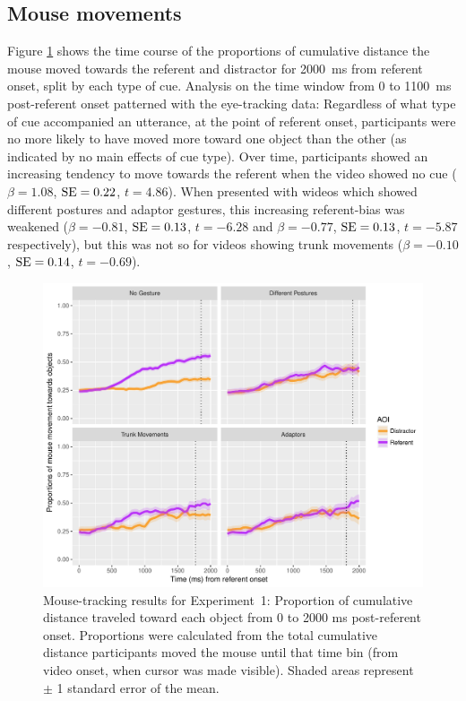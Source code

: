\documentclass[a4paper,man,natbib]{apa6}
\newcommand{\resultsLM}[3]{$\beta = #1$, $\textnormal{SE} = #2$, $t #3$}
\begin{document}
\subsection{Mouse movements}
Figure \ref{fig:v1_mouse} shows the time course of the proportions of cumulative distance the mouse moved towards the referent and distractor for 2000~ms from referent onset, split by each type of cue.
Analysis on the time window from 0 to 1100~ms post-referent onset patterned with the eye-tracking data:
Regardless of what type of cue accompanied an utterance, at the point of referent onset, participants were no more likely to have moved more toward one object than the other (as indicated by no main effects of cue type).
Over time, participants showed an increasing tendency to move towards the referent when the video showed no cue (\resultsLM{1.08}{0.22}{=4.86}).
When presented with wideos which showed different postures and adaptor gestures, this increasing referent-bias was weakened (\resultsLM{-0.81}{0.13}{=-6.28} and \resultsLM{-0.77}{0.13}{=-5.87} respectively), but this was not so for videos showing trunk movements (\resultsLM{-0.10}{0.14}{=-0.69}). 

\begin{figure}[Ht]
  \centering
	\includegraphics[width=\linewidth]{./img/e7_mouset.pdf}
  \caption{Mouse-tracking results for Experiment~1: Proportion of cumulative distance traveled toward each object from 0 to 2000 ms post-referent onset. Proportions were calculated from the total cumulative distance participants moved the mouse until that time bin (from video onset, when cursor was made visible). Shaded areas represent $\pm$ 1 standard error of the mean.}
  \label{fig:v1_mouse}
\end{figure}
\end{document}
